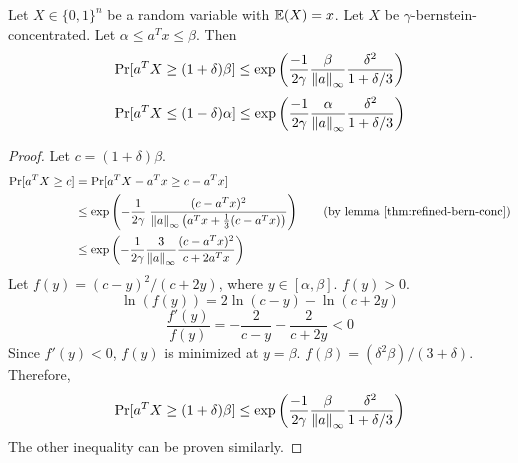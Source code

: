 \begin{theorem}
\label{thm:lin-bound-bern-conc}
Let $X \in \{0, 1\}^n$ be a random variable with $\operatorname{\mathbb{E}}(X) = x$.
Let $X$ be $\gamma$-bernstein-concentrated.
Let $\alpha \le a^Tx \le \beta$. Then
\[ \Pr[ a^TX \ge (1+\delta)\beta ]
\le \exp\left(\frac{-1}{2\gamma} \frac{\beta}{\left\lVert a \right\rVert_{\infty}} \frac{\delta^2}{1+\delta/3} \right) \]
\[ \Pr[ a^TX \le (1-\delta)\alpha ]
\le \exp\left(\frac{-1}{2\gamma} \frac{\alpha}{\left\lVert a \right\rVert_{\infty}} \frac{\delta^2}{1+\delta/3} \right) \]
\end{theorem}
\begin{proof}
Let $c = (1+\delta)\beta$.
\begin{align*}
\Pr[ a^TX \ge c ]
&= \Pr[ a^TX - a^Tx \ge c - a^Tx ]
\\ &\le \exp\left( -\frac{1}{2\gamma} \; \frac{(c-a^Tx)^2}{\norm{a}_{\infty}
\left(a^Tx + \frac{1}{3}(c - a^Tx)\right)} \right)
\tag{by lemma \ref{thm:refined-bern-conc}}
\\ &\le \exp\left( -\frac{1}{2\gamma} \frac{3}{\norm{a}_{\infty}} \frac{(c-a^Tx)^2}{c + 2a^Tx} \right)
\end{align*}
Let $f(y) = (c-y)^2/(c+2y)$, where $y \in [\alpha, \beta]$. $f(y) > 0$.
\[ \ln(f(y)) = 2\ln(c-y) - \ln(c+2y) \]
\[ \frac{f'(y)}{f(y)} = -\frac{2}{c-y} - \frac{2}{c+2y} < 0 \]
Since $f'(y) < 0$, $f(y)$ is minimized at $y = \beta$.
$f(\beta) = (\delta^2\beta)/(3 + \delta)$.
Therefore,
\[ \Pr[ a^TX \ge (1+\delta)\beta ]
\le \exp\left( \frac{-1}{2\gamma} \frac{\beta}{\left\lVert a \right\rVert_{\infty}} \frac{\delta^2}{1+\delta/3} \right) \]
The other inequality can be proven similarly.
\end{proof}
